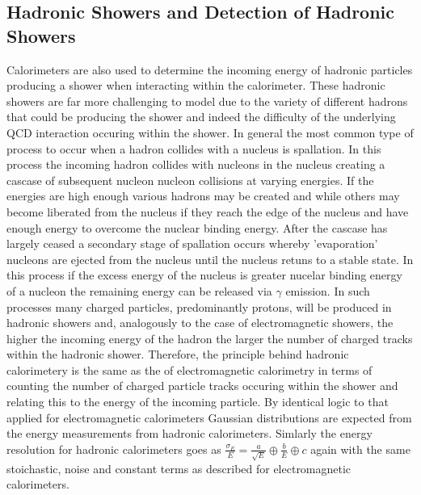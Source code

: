\subsection{Hadronic Showers and Detection of Hadronic Showers}
Calorimeters are also used to determine the incoming energy of hadronic particles producing a shower when interacting within the calorimeter.  These hadronic showers are far more challenging to model due to the variety of different hadrons that could be producing the shower and indeed the difficulty of the underlying QCD interaction occuring within the shower.  In general the most common type of process to occur when a hadron collides with a nucleus is spallation.  In this process the incoming hadron collides with nucleons in the nucleus creating a cascase of subsequent nucleon nucleon collisions at varying energies.  If the energies are high enough various hadrons may be created and while others may become liberated from the nucleus if they reach the edge of the nucleus and have enough energy to overcome the nuclear binding energy.  After the cascase has largely ceased a secondary stage of spallation occurs whereby 'evaporation' nucleons are ejected from the nucleus until the nucleus retuns to a stable state.  In this process if the excess energy of the nucleus is greater nucelar binding energy of a nucleon the remaining energy can be released via $\gamma$ emission.  In such processes many charged particles, predominantly protons, will be produced in hadronic showers and, analogously to the case of electromagnetic showers, the higher the incoming energy of the hadron the larger the number of charged tracks within the hadronic shower.  Therefore, the principle behind hadronic calorimetery is the same as the of electromagnetic calorimetry in terms of counting the number of charged particle tracks occuring within the shower and relating this to the energy of the incoming particle.  By identical logic to that applied for electromagnetic calorimeters Gaussian distributions are expected from the energy measurements from hadronic calorimeters.  Simlarly the energy resolution for hadronic calorimeters goes as $\frac{\sigma_{E}}{E} = \frac{a}{\sqrt{E}} \oplus \frac{b}{E} \oplus c$ again with the same stoichastic, noise and constant terms as described for electromagnetic calorimeters.

